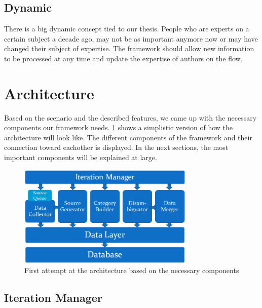 \subsection{Dynamic}

There is a big dynamic concept tied to our thesis. People who are experts on a certain subject a decade ago, may not be as important anymore now or may have changed their subject of expertise. The framework should allow new information to be processed at any time and update the expertise of authors on the flow.

\section{Architecture}


Based on the scenario and the described features, we came up with the necessary components our framework needs. \ref{fig:architectuur} shows a simplistic version of how the architecture will look like. The different components of the framework and their connection toward eachother is displayed. In the next sections, the most important components will be explained at large.


\begin{figure}[htbp]
	\centering
		\includegraphics[width=0.75\textwidth]{fig/architectuur.png}
	\caption{First attempt at the architecture based on the necessary components}
	\label{fig:architectuur}
\end{figure}

\subsection{Iteration Manager}

